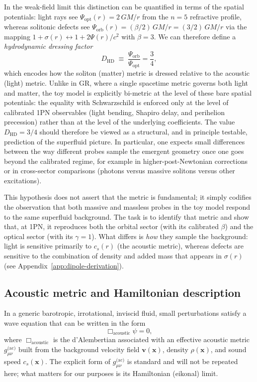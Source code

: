 \documentclass[11pt]{article}
\begin{document}
In the weak-field limit this distinction can be quantified in terms of the
spatial potentials: light rays see
$\Psi_{\text{opt}}(r) = 2\,GM/r$ from the $n=5$ refractive profile,
whereas solitonic defects see
$\Psi_{\text{orb}}(r) = (\beta/2)\,GM/r = (3/2)\,GM/r$ via the mapping
$1+\sigma(r) \leftrightarrow 1+2\Psi(r)/c^2$ with $\beta = 3$.
We can therefore define a \emph{hydrodynamic dressing factor}
\begin{equation}
  D_{\mathrm{HD}}
  \;\equiv\;
  \frac{\Psi_{\text{orb}}}{\Psi_{\text{opt}}}
  = \frac{3}{4},
\end{equation}
which encodes how the soliton (matter) metric is dressed relative to the
acoustic (light) metric.
Unlike in GR, where a single spacetime metric governs both light and
matter, the toy model is explicitly bi-metric at the level of these bare
spatial potentials: the equality with Schwarzschild is enforced only at the
level of calibrated 1PN observables (light bending, Shapiro delay, and
perihelion precession) rather than at the level of the underlying
coefficients.
The value $D_{\mathrm{HD}} = 3/4$ should therefore be viewed as a structural,
and in principle testable, prediction of the superfluid picture.
In particular, one expects small differences between the way different
probes sample the emergent geometry once one goes beyond the calibrated
regime, for example in higher-post-Newtonian corrections or in
cross-sector comparisons (photons versus massive solitons versus other
excitations).

This hypothesis does not assert that the metric is fundamental; it simply
codifies the observation that both massive and massless probes in the toy
model respond to the same superfluid background.
The task is to identify that metric and show that, at 1PN, it reproduces
both the orbital sector (with its calibrated $\beta$) and the optical sector
(with its $\gamma=1$).
What differs is \emph{how} they sample the background: light is sensitive
primarily to $c_s(r)$ (the acoustic metric), whereas defects are sensitive
to the combination of density and added mass that appears in $\sigma(r)$
(see Appendix~\ref{app:dipole-derivation}).


\subsection{Acoustic metric and Hamiltonian description}
\label{subsec:acoustic-metric}

In a generic barotropic, irrotational, inviscid fluid, small perturbations
satisfy a wave equation that can be written in the form
\begin{equation}
  \Box_{\text{acoustic}} \psi = 0,
\end{equation}
where $\Box_{\text{acoustic}}$ is the d'Alembertian associated with an
effective acoustic metric $g^{\text{(ac)}}_{\mu\nu}$ built from the
background velocity field $\mathbf{v}(\mathbf{x})$, density
$\rho(\mathbf{x})$, and sound speed $c_s(\mathbf{x})$.
The explicit form of $g^{\text{(ac)}}_{\mu\nu}$ is standard and will not be
repeated here; what matters for our purposes is its Hamiltonian
(eikonal) limit.  
\end{document}
